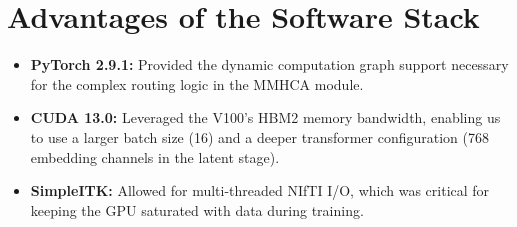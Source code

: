 \section{Advantages of the Software Stack}
\begin{itemize}
    \item \textbf{PyTorch 2.9.1:} Provided the dynamic computation graph support necessary for the complex routing logic in the MMHCA module.
    \item \textbf{CUDA 13.0:} Leveraged the V100's HBM2 memory bandwidth, enabling us to use a larger batch size (16) and a deeper transformer configuration (768 embedding channels in the latent stage).
    \item \textbf{SimpleITK:} Allowed for multi-threaded NIfTI I/O, which was critical for keeping the GPU saturated with data during training.
\end{itemize}

